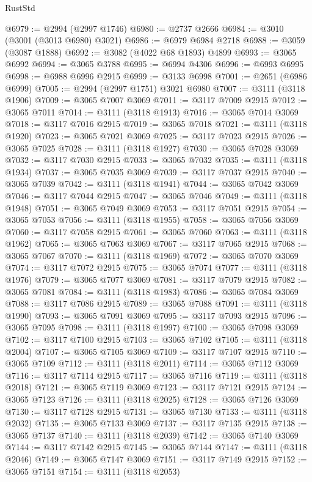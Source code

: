 \begin{lexlean}{RustStd}
\begin{coremodule}
@6979 := @2994 (@2997 @1746)
@6980 := @2737 @2666
@6984 := @3010 (@3001 (@3013 @6980) @3021)
@6986 := @6979 @6984 @2718
@6988 := @3059 (@3087 @1888)
@6992 := @3082 (@4022 @68 @1893) @4899
@6993 := @3065 @6992
@6994 := @3065 @3788
@6995 := @6994 @4306
@6996 := @6993 @6995
@6998 := @6988 @6996 @2915
@6999 := @3133 @6998
@7001 := @2651 (@6986 @6999)
@7005 := @2994 (@2997 @1751) @3021 @6980
@7007 := @3111 (@3118 @1906)
@7009 := @3065 @7007 @3069
@7011 := @3117 @7009 @2915
@7012 := @3065 @7011
@7014 := @3111 (@3118 @1913)
@7016 := @3065 @7014 @3069
@7018 := @3117 @7016 @2915
@7019 := @3065 @7018
@7021 := @3111 (@3118 @1920)
@7023 := @3065 @7021 @3069
@7025 := @3117 @7023 @2915
@7026 := @3065 @7025
@7028 := @3111 (@3118 @1927)
@7030 := @3065 @7028 @3069
@7032 := @3117 @7030 @2915
@7033 := @3065 @7032
@7035 := @3111 (@3118 @1934)
@7037 := @3065 @7035 @3069
@7039 := @3117 @7037 @2915
@7040 := @3065 @7039
@7042 := @3111 (@3118 @1941)
@7044 := @3065 @7042 @3069
@7046 := @3117 @7044 @2915
@7047 := @3065 @7046
@7049 := @3111 (@3118 @1948)
@7051 := @3065 @7049 @3069
@7053 := @3117 @7051 @2915
@7054 := @3065 @7053
@7056 := @3111 (@3118 @1955)
@7058 := @3065 @7056 @3069
@7060 := @3117 @7058 @2915
@7061 := @3065 @7060
@7063 := @3111 (@3118 @1962)
@7065 := @3065 @7063 @3069
@7067 := @3117 @7065 @2915
@7068 := @3065 @7067
@7070 := @3111 (@3118 @1969)
@7072 := @3065 @7070 @3069
@7074 := @3117 @7072 @2915
@7075 := @3065 @7074
@7077 := @3111 (@3118 @1976)
@7079 := @3065 @7077 @3069
@7081 := @3117 @7079 @2915
@7082 := @3065 @7081
@7084 := @3111 (@3118 @1983)
@7086 := @3065 @7084 @3069
@7088 := @3117 @7086 @2915
@7089 := @3065 @7088
@7091 := @3111 (@3118 @1990)
@7093 := @3065 @7091 @3069
@7095 := @3117 @7093 @2915
@7096 := @3065 @7095
@7098 := @3111 (@3118 @1997)
@7100 := @3065 @7098 @3069
@7102 := @3117 @7100 @2915
@7103 := @3065 @7102
@7105 := @3111 (@3118 @2004)
@7107 := @3065 @7105 @3069
@7109 := @3117 @7107 @2915
@7110 := @3065 @7109
@7112 := @3111 (@3118 @2011)
@7114 := @3065 @7112 @3069
@7116 := @3117 @7114 @2915
@7117 := @3065 @7116
@7119 := @3111 (@3118 @2018)
@7121 := @3065 @7119 @3069
@7123 := @3117 @7121 @2915
@7124 := @3065 @7123
@7126 := @3111 (@3118 @2025)
@7128 := @3065 @7126 @3069
@7130 := @3117 @7128 @2915
@7131 := @3065 @7130
@7133 := @3111 (@3118 @2032)
@7135 := @3065 @7133 @3069
@7137 := @3117 @7135 @2915
@7138 := @3065 @7137
@7140 := @3111 (@3118 @2039)
@7142 := @3065 @7140 @3069
@7144 := @3117 @7142 @2915
@7145 := @3065 @7144
@7147 := @3111 (@3118 @2046)
@7149 := @3065 @7147 @3069
@7151 := @3117 @7149 @2915
@7152 := @3065 @7151
@7154 := @3111 (@3118 @2053)

\end{coremodule}
\end{lexlean}
